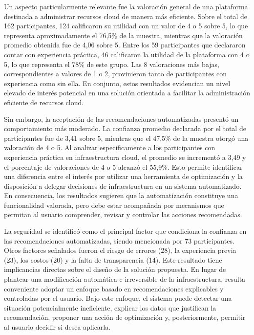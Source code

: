 Un aspecto particularmente relevante fue la valoración general de una plataforma destinada a administrar recursos cloud de manera más eficiente. Sobre el total de 162 participantes, 124 calificaron su utilidad con un valor de 4 o 5 sobre 5, lo que representa aproximadamente el 76,5\% de la muestra, mientras que la valoración promedio obtenida fue de 4,06 sobre 5. Entre los 59 participantes que declararon contar con experiencia práctica, 46 calificaron la utilidad de la plataforma con 4 o 5, lo que representa el 78\% de este grupo. Las 8 valoraciones más bajas, correspondientes a valores de 1 o 2, provinieron tanto de participantes con experiencia como sin ella. En conjunto, estos resultados evidencian un nivel elevado de interés potencial en una solución orientada a facilitar la administración eficiente de recursos cloud.

Sin embargo, la aceptación de las recomendaciones automatizadas presentó un comportamiento más moderado. La confianza promedio declarada por el total de participantes fue de 3,41 sobre 5, mientras que el 47,5\% de la muestra otorgó una valoración de 4 o 5. Al analizar específicamente a los participantes con experiencia práctica en infraestructura cloud, el promedio se incrementó a 3,49 y el porcentaje de valoraciones de 4 o 5 alcanzó el 55,9\%. Esto permite identificar una diferencia entre el interés por utilizar una herramienta de optimización y la disposición a delegar decisiones de infraestructura en un sistema automatizado. En consecuencia, los resultados sugieren que la automatización constituye una funcionalidad valorada, pero debe estar acompañada por mecanismos que permitan al usuario comprender, revisar y controlar las acciones recomendadas.

La seguridad se identificó como el principal factor que condiciona la confianza en las recomendaciones automatizadas, siendo mencionada por 73 participantes. Otros factores señalados fueron el riesgo de errores (28), la experiencia previa (23), los costos (20) y la falta de transparencia (14). Este resultado tiene implicancias directas sobre el diseño de la solución propuesta. En lugar de plantear una modificación automática e irreversible de la infraestructura, resulta conveniente adoptar un enfoque basado en recomendaciones explicables y controladas por el usuario. Bajo este enfoque, el sistema puede detectar una situación potencialmente ineficiente, explicar los datos que justifican la recomendación, proponer una acción de optimización y, posteriormente, permitir al usuario decidir si desea aplicarla.

